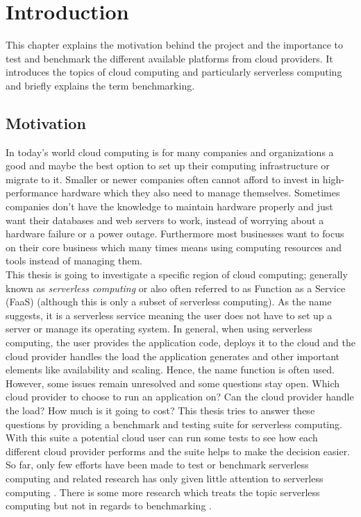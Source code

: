 \section{Introduction}
This chapter explains the motivation behind the project and the importance to test and benchmark the different available platforms from cloud providers. It introduces the topics of cloud computing and particularly serverless computing and briefly explains the term benchmarking.
\subsection{Motivation}
In today's world cloud computing is for many companies and organizations a good and maybe the best option to set up their computing infrastructure or migrate to it. Smaller or newer companies often cannot afford to invest in high-performance hardware which they also need to manage themselves. Sometimes companies don't have the knowledge to maintain hardware properly and just want their databases and web servers to work, instead of worrying about a hardware failure or a power outage. Furthermore most businesses want to focus on their core business which many times means using computing resources and tools instead of managing them.\\
This thesis is going to investigate a specific region of cloud computing; generally known as \textit{serverless computing} or also often referred to as Function as a Service (\gls{FaaS}) (although this is only a subset of serverless computing). As the name suggests, it is a serverless service meaning the user does not have to set up a server or manage its operating system. In general, when using serverless computing, the user provides the application code, deploys it to the cloud and the cloud provider handles the load the application generates and other important elements like availability and scaling. Hence, the name function is often used.\\
However, some issues remain unresolved and some questions stay open. Which cloud provider to choose to run an application on? Can the cloud provider handle the load? How much is it going to cost? This thesis tries to answer these questions by providing a benchmark and testing suite for serverless computing. With this suite a potential cloud user can run some tests to see how each different cloud provider performs and the suite helps to make the decision easier.\\
So far, only few efforts have been made to test or benchmark serverless computing \cite{doi:10.1002/cpe.4792, Kuntsevich:2018:DAB:3284014.3284016, EoPSCE, 10.1007/978-3-319-75178-8_34} and related research has only given little attention to serverless computing \cite{Gan:2019:OBS:3297858.3304013}. There is some more research which treats the topic serverless computing but not in regards to benchmarking \cite{Baldini2017, riseofserverless, vanEyk:2017:SCG:3154847.3154848}.
